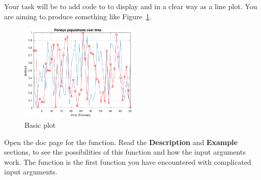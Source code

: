 \documentclass{article}
\begin{document}
Your task will be to add code to  to display  and  in a clear way as a line plot.
You are aiming to produce something like Figure~\ref{fig:basic}.
\begin{figure}[h]
  \centering
  \includegraphics[width=0.5\textwidth]{figs/basicplot.pdf}
  \caption{Basic plot}\label{fig:basic}
\end{figure}

Open the doc page for the  function.
Read the \textbf{Description} and \textbf{Example} sections, to see the possibilities of this function and how the input arguments work.
The  function is the first function you have encountered with complicated input arguments.
\end{document}

